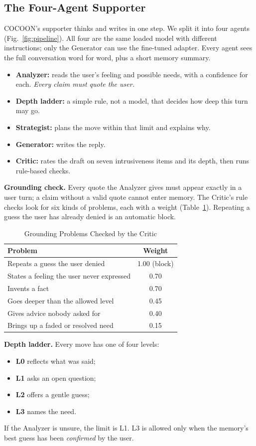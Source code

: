 \documentclass[journal]{IEEEtran}
\newcommand{\tsize}{\footnotesize}
\begin{document}
\subsection{The Four-Agent Supporter}\label{sec:agents}
COCOON's supporter thinks and writes in one step. We split it into four agents (Fig.~\ref{fig:pipeline}). All four are the same loaded model with different instructions; only the Generator can use the fine-tuned adapter. Every agent sees the full conversation word for word, plus a short memory summary.
\begin{itemize}
\item \textbf{Analyzer:} reads the user's feeling and possible needs, with a confidence for each. \emph{Every claim must quote the user.}
\item \textbf{Depth ladder:} a simple rule, not a model, that decides how deep this turn may go.
\item \textbf{Strategist:} plans the move within that limit and explains why.
\item \textbf{Generator:} writes the reply.
\item \textbf{Critic:} rates the draft on seven intrusiveness items and its depth, then runs rule-based checks.
\end{itemize}
\textbf{Grounding check.} Every quote the Analyzer gives must appear exactly in a user turn; a claim without a valid quote cannot enter memory. The Critic's rule checks look for six kinds of problems, each with a weight (Table~\ref{tab:viol}). Repeating a guess the user has already denied is an automatic block.

\begin{table}[!htb]
\caption{Grounding Problems Checked by the Critic}
\label{tab:viol}
\centering\tsize
\begin{tabular}{@{}lc@{}}
\toprule
Problem & Weight\\
\midrule
Repeats a guess the user denied & 1.00 (block)\\
States a feeling the user never expressed & 0.70\\
Invents a fact & 0.70\\
Goes deeper than the allowed level & 0.45\\
Gives advice nobody asked for & 0.40\\
Brings up a faded or resolved need & 0.15\\
\bottomrule
\end{tabular}
\end{table}

\textbf{Depth ladder.} Every move has one of four levels:
\begin{itemize}
\item \textbf{L0} reflects what was said;
\item \textbf{L1} asks an open question;
\item \textbf{L2} offers a gentle guess;
\item \textbf{L3} names the need.
\end{itemize}
If the Analyzer is unsure, the limit is L1. L3 is allowed only when the memory's best guess has been \emph{confirmed} by the user.
\end{document}
